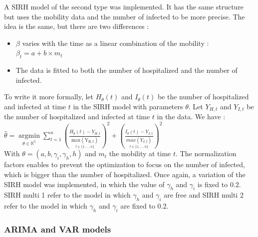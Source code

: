 A SIRH model of the second type was implemented. 
It has the same structure but uses the mobility data and the number of infected to be more precise. 
The idea is the same, but there are two differences : 
\begin{itemize}
    \item $\beta$ varies with the time as a linear combination of the mobility : $\beta_t = a + b \times m_t$ 
    \item The data is fitted to both the number of hospitalized and the number of infected. 
\end{itemize}
To write it more formally, let $H_\theta(t)$ and $I_\theta(t)$ be the number of hospitalized and infected at time $t$ in the SIRH model with parameters $\theta$.
Let $Y_{H, t}$ and $Y_{I, t}$ be the number of hospitalized and infected at time $t$ in the data.
We have :\\

$\hat{\theta} = \underset{\theta \in \mathbb{R}^5}{\operatorname{argmin}} \sum_{t=1}^{n} (\frac{H_\theta(t) - Y_{H, t}}{\underset{t \in \{1, ..., n \}}{\operatorname{max(Y_{H, t})}}})^2 + (\frac{I_\theta(t) - Y_{I, t}}{\underset{t \in \{1, ..., n \}}{max(Y_{I, t})}})^2$\\

With $\theta = (a, b, \gamma_i, \gamma_h, h)$ and $m_t$ the mobility at time $t$.
The normalization factors enables to prevent the optimization to focus on the number of infected, which is bigger than the number of hospitalized. 
Once again, a variation of the SIRH model was implemented, in which the value of $\gamma_h$ and $\gamma_i$ is fixed to $0.2$. 
SIRH multi 1 refer to the model in which $\gamma_h$ and $\gamma_i$ are free and SIRH multi 2 refer to the model in which $\gamma_h$ and $\gamma_i$ are fixed to $0.2$.



\subsubsection{ARIMA and VAR models} 

